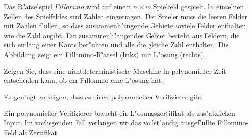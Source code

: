 Das R"atselspiel {\it Fillomino} wird auf einem $n\times m$ Spielfeld 
gespielt. In einzelnen Zellen des Spielfeldes sind Zahlen eingetragen.
Der Spieler muss die leeren Felder mit Zahlen f"ullen, so dass
zusammenh"angende Gebiete soviele Felder enthalten
wie die Zahl angibt. Ein zusammenh"angendes Gebiet besteht aus Feldern,
die sich entlang einer Kante ber"uhren und alle die gleiche Zahl enthalten.
Die Abbildung zeigt ein Fillomino-R"atsel (links) mit L"osung (rechts).
\begin{center}
\qquad
{}
\end{center}
Zeigen Sie, dass eine nichtdeterministische Maschine in polynomieller
Zeit entscheiden kann, ob ein Fillomino eine L"osung hat.

\begin{loesung}
Es gen"ugt zu zeigen, dass es einen polynomiellen Verifizierer gibt.

Ein polynomieller Verifizierer braucht ein L"osungszertifikat als 
zus"atzlichen Input. Im vorliegenden Fall verlangen wir das vollst"andig
ausgef"ullte Fillomino-Feld als Zertifikat.


\end{loesung}
